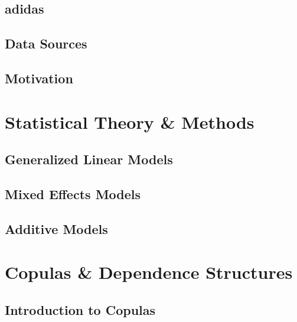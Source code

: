 \documentclass[12pt, twoside]{article}
\numberwithin{equation}{section}
\numberwithin{table}{section}
\numberwithin{figure}{section}
\begin{document}
\subsection{adidas} \label{ssec:adidas}

\subsection{Data Sources} \label{ssec:data_sources}

\subsection{Motivation} \label{ssec:motivation}

%
\newpage
\thispagestyle{empty}
\cleardoublepage

\thispagestyle{plain}
\section{Statistical Theory \& Methods} \label{sec:theory_and_methods}

\subsection{Generalized Linear Models} \label{ssec:glm}

\subsection{Mixed Effects Models} \label{ssec:mixed_models}

\subsection{Additive Models} \label{ssec:gam}

\newpage
\thispagestyle{empty}
\cleardoublepage

\thispagestyle{plain}
\section{Copulas \& Dependence Structures} \label{sec:copulas_and_dependence_structures}

\subsection{Introduction to Copulas} \label{ssec:intro_to_copulas}

\end{document}
